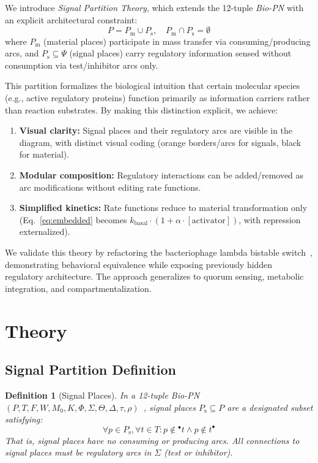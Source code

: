 \documentclass[twocolumn,10pt]{article}
\newtheorem{definition}{Definition}
\newcommand{\biopn}{\textit{Bio-PN}}
\newcommand{\Pm}{P_{\text{m}}}
\newcommand{\Ps}{P_{\text{s}}}
\begin{document}
We introduce \textit{Signal Partition Theory}, which extends the 12-tuple \biopn{} with an explicit architectural constraint:
%
\begin{equation}
P = \Pm \cup \Ps, \quad \Pm \cap \Ps = \emptyset
\label{eq:partition}
\end{equation}
%
where $\Pm$ (material places) participate in mass transfer via consuming/producing arcs, and $\Ps \subseteq \Psi$ (signal places) carry regulatory information sensed without consumption via test/inhibitor arcs only.

This partition formalizes the biological intuition that certain molecular species (e.g., active regulatory proteins) function primarily as information carriers rather than reaction substrates. By making this distinction explicit, we achieve:

\begin{enumerate}
\item \textbf{Visual clarity:} Signal places and their regulatory arcs are visible in the diagram, with distinct visual coding (orange borders/arcs for signals, black for material).
\item \textbf{Modular composition:} Regulatory interactions can be added/removed as arc modifications without editing rate functions.
\item \textbf{Simplified kinetics:} Rate functions reduce to material transformation only (Eq.~\ref{eq:embedded} becomes $k_{\text{basal}} \cdot (1 + \alpha \cdot [\text{activator}])$, with repression externalized).
\end{enumerate}

We validate this theory by refactoring the bacteriophage lambda bistable switch~\cite{ptashne2004genetic,arkin1998stochastic}, demonstrating behavioral equivalence while exposing previously hidden regulatory architecture. The approach generalizes to quorum sensing, metabolic integration, and compartmentalization.

\section{Theory}

\subsection{Signal Partition Definition}

\begin{definition}[Signal Places]
In a 12-tuple \biopn{} $(P, T, F, W, M_0, K, \Phi, \Sigma, \Theta, \Delta, \tau, \rho)$~\cite{simao2025weak}, signal places $\Ps \subseteq P$ are a designated subset satisfying:
%
\begin{equation}
\forall p \in \Ps, \forall t \in T: p \notin {^\bullet}t \wedge p \notin t^\bullet
\end{equation}
%
That is, signal places have \textit{no consuming or producing arcs}. All connections to signal places must be regulatory arcs in $\Sigma$ (test or inhibitor).
\end{definition}
\end{document}
